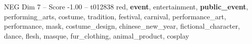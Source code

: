 \begin{textsample}{NEG Dim 7 – Score -1.00 – t012838}  \label{ex:f7_neg_025}
red, \textbf{event}, entertainment, \textbf{public\_event}, performing\_arts, costume, tradition, festival, carnival, performance\_art, performance, mask, costume\_design, chinese\_new\_year, fictional\_character, dance, flesh, masque, fur\_clothing, animal\_product, cosplay

\end{textsample}

